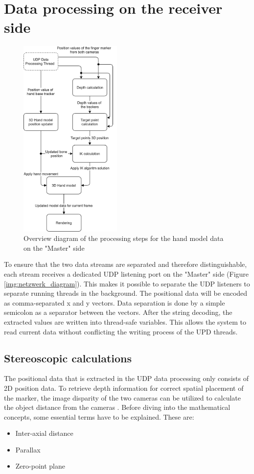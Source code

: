 \section{Data processing on the receiver side}
\begin{figure}
\label{img:hand_model_workflow}
\includegraphics[width=0.45\textwidth]{images/Rendering_workflow.png} 
\caption{Overview diagram of the processing steps for the hand model data on the "Master" side}
\end{figure}
To ensure that the two data streams are separated and therefore distinguishable, each stream receives a dedicated UDP listening port on the "Master" side (Figure \ref{img:netzwerk_diagram}). This makes it possible to separate the UDP listeners to separate running threads in the background. The positional data will be encoded as comma-separated x and y vectors. Data separation is done by a simple semicolon as a separator between the vectors. After the string decoding, the extracted values are written into thread-safe variables. This allows the system to read current data without conflicting the writing process of the UPD threads.
\subsection{Stereoscopic calculations}
The positional data that is extracted in the UDP data processing only consists of 2D position data. To retrieve depth information for correct spatial placement of the marker, the image disparity of the two cameras can be utilized to calculate the object distance from the cameras \cite{Tauer.2010}.\newpage
Before diving into the mathematical concepts, some essential terms have to be explained.
These are:
\begin{itemize}
\item Inter-axial distance
\item Parallax
\item Zero-point plane
\end{itemize}
